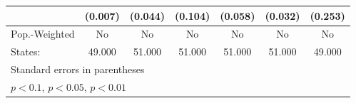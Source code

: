 {\begin{tabular}{l*{6}{c}}
            &     (0.007)         &     (0.044)         &     (0.104)         &     (0.058)         &     (0.032)         &     (0.253)         \\
\hline
Pop.-Weighted&          No         &          No         &          No         &          No         &          No         &          No         \\
States:     &      49.000         &      51.000         &      51.000         &      51.000         &      51.000         &      49.000         \\
\hline\hline
\multicolumn{7}{l}{\footnotesize Standard errors in parentheses}\\
\multicolumn{7}{l}{\footnotesize \sym{*} \(p<0.1\), \sym{**} \(p<0.05\), \sym{***} \(p<0.01\)}\\
\end{tabular}
}
